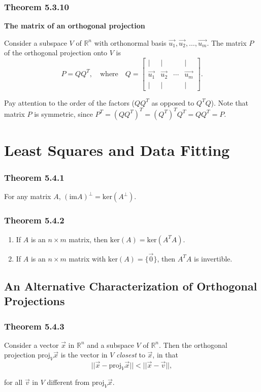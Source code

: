 \documentclass{report}
\begin{document}
\subsubsection*{Theorem 5.3.10}
\par\noindent\textbf{The matrix of an orthogonal projection}
\par\noindent Consider a subspace $V$ of $\mathbb{R}^{n}$ with orthonormal basis $\vec{u_{1}},\vec{u_{2}},\ldots{},\vec{u_{m}}$. The matrix $P$ of the orthogonal projection onto $V$ is
\[P=QQ^{T},\quad\textrm{where}\quad{}Q=\left[\begin{array}{cccc}|&|&&|\\ \vec{u_{1}}&\vec{u_{2}}&\cdots{}&\vec{u_{m}}\\{} |&|&&|\end{array}\right].\]
\par\noindent Pay attention to the order of the factors ($QQ^{T}$ as opposed to $Q^{T}Q$). Note that matrix $P$ is symmetric, since $P^{T}=(QQ^{T})^{T}=(Q^{T})^{T}Q^{T}=QQ^{T}=P$.

\section{Least Squares and Data Fitting}
\subsubsection*{Theorem 5.4.1}
\par\noindent For any matrix $A$, $(\textrm{im}A)^{\perp}=\textrm{ker}(A^{\perp})$.
\subsubsection*{Theorem 5.4.2}
\renewcommand{\labelenumi}{\textbf{\alph{enumi}.}}
\begin{enumerate}
\item If $A$ is an $n\times{}m$ matrix, then $\textrm{ker}(A)=\textrm{ker}(A^{T}A)$.
\item If $A$ is an $n\times{}m$ matrix with $\textrm{ker}(A)=\{\vec{0}\}$, then $A^{T}A$ is invertible.
\end{enumerate}
\subsection*{An Alternative Characterization of Orthogonal Projections}
\subsubsection*{Theorem 5.4.3}
\par\noindent Consider a vector $\vec{x}$ in $\mathbb{R}^{n}$ and a subspace $V$ of $\mathbb{R}^{n}$. Then the orthogonal projection $\textrm{proj}_{V}\vec{x}$ is the vector in $V$ \textit{closest} to $\vec{x}$, in that
\[||\vec{x}-\textrm{proj}_{V}\vec{x}||<{}||\vec{x}-\vec{v}||,\]
\par\noindent for all $\vec{v}$ in $V$ different from $\textrm{proj}_{V}\vec{x}$.
\end{document}
